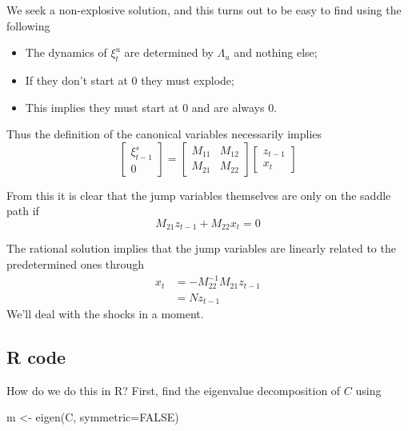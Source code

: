 \documentclass[
  letterpaper,
]{book}
\newenvironment{Shaded}{\begin{snugshade}}{\end{snugshade}}
\newcommand{\AttributeTok}[1]{\textcolor[rgb]{0.40,0.45,0.13}{#1}}
\newcommand{\ConstantTok}[1]{\textcolor[rgb]{0.56,0.35,0.01}{#1}}
\newcommand{\FunctionTok}[1]{\textcolor[rgb]{0.28,0.35,0.67}{#1}}
\newcommand{\NormalTok}[1]{\textcolor[rgb]{0.00,0.23,0.31}{#1}}
\newcommand{\OtherTok}[1]{\textcolor[rgb]{0.00,0.23,0.31}{#1}}
\providecommand{\tightlist}{%
  \setlength{\itemsep}{0pt}\setlength{\parskip}{0pt}}\usepackage{longtable,booktabs,array}
\begin{document}
We seek a non-explosive solution, and this turns out to be easy to find
using the following

\begin{itemize}
\tightlist
\item
  The dynamics of \(\xi_t^u\) are determined by \(\Lambda_u\) and
  nothing else;
\item
  If they don't start at \(0\) they must explode;
\item
  This implies they must start at \(0\) and are always \(0\).
\end{itemize}

Thus the definition of the canonical variables necessarily implies \[
\begin{bmatrix} \xi_{t-1}^s \\  0 \end{bmatrix}
  =  \begin{bmatrix} M_{11} & M_{12} \\  M_{21} & M_{22} \end{bmatrix}
      \begin{bmatrix} z_{t-1} \\  x_t \end{bmatrix}
\]

From this it is clear that the jump variables themselves are only on the
saddle path if \[
   M_{21} z_{t-1} + M_{22} x_t = 0
\]

The rational solution implies that the jump variables are linearly
related to the predetermined ones through \[
\begin{aligned}
x_t &= -M_{22}^{-1} M_{21}z_{t-1} \\
    &= N z_{t-1}
\end{aligned}
\] We'll deal with the shocks in a moment.

\hypertarget{r-code}{%
\subsection{R code}\label{r-code}}

How do we do this in R? First, find the eigenvalue decomposition of
\(C\) using

\begin{Shaded}
\begin{Highlighting}[]
\NormalTok{m }\OtherTok{\textless{}{-}} \FunctionTok{eigen}\NormalTok{(C, }\AttributeTok{symmetric=}\ConstantTok{FALSE}\NormalTok{)}
\end{Highlighting}
\end{Shaded}
\end{document}
